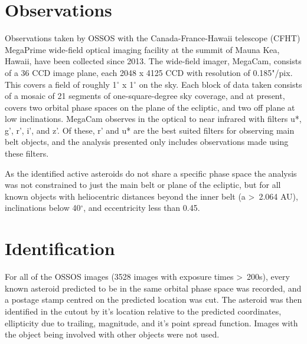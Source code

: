 \documentclass[iop,apj]{emulateapj}
\begin{document}

\section{Observations}

Observations taken by OSSOS with the Canada-France-Hawaii telescope (CFHT) MegaPrime wide-field optical imaging facility  at the summit of Mauna Kea, Hawaii, have been collected since 2013. The wide-field imager, MegaCam, consists of a 36 CCD image plane, each 2048 x 4125 CCD with resolution of 0.185"/pix. This covers a field of  roughly 1$^{\circ}$ x 1$^{\circ}$ on the sky. Each block of data taken consists of a mosaic of 21 segments of one-square-degree sky coverage, and at present, covers two orbital phase spaces on the plane of the ecliptic, and two off plane at low inclinations. MegaCam observes in the optical to near infrared with filters u*, g', r', i', and z'. Of these, r' and u* are the best suited filters for observing main belt objects, and the analysis presented only includes observations made using these filters. 




As the identified active asteroids do not share a specific phase space the analysis was not constrained to just the main belt or plane of the ecliptic, but for all known objects with heliocentric distances beyond the inner belt (a \textgreater \, 2.064 AU), inclinations below 40$^{\circ}$, and eccentricity less than 0.45. 

\section{Identification}

For all of the OSSOS images (3528 images with exposure times \textgreater \, 200s), every known asteroid predicted to be in the same orbital phase space was recorded, and a postage stamp centred on the predicted location was cut. The asteroid was then identified in the cutout by it's location relative to the predicted coordinates,  ellipticity due to trailing,  magnitude, and it's point spread function. Images with the object being involved with other objects were not used. 
\end{document}
